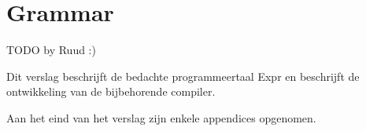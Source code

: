 \chapter{Grammar}

TODO by Ruud :)

Dit verslag beschrijft de bedachte programmeertaal Expr en beschrijft de
ontwikkeling van de bijbehorende compiler.

Aan het eind van het verslag zijn enkele appendices opgenomen. 
